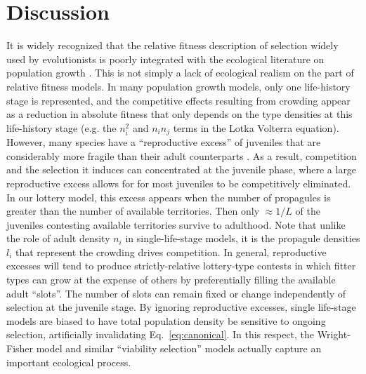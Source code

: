 \documentclass[11pt]{article}
\begin{document}
\section*{Discussion}

It is widely recognized that the relative fitness description of selection widely used by evolutionists is poorly integrated with the ecological literature on population growth \citep{mallet_2012}. This is not simply a lack of ecological realism on the part of relative fitness models. In many population growth models, only one life-history stage is represented, and the competitive effects resulting from crowding appear as a reduction in absolute fitness that only depends on the type densities at this life-history stage (e.g. the $n_i^2$ and $n_in_j$ terms in the Lotka Volterra equation). However, many species have a ``reproductive excess'' of juveniles that are considerably more fragile than their adult counterparts \citep{chesson_1983}. As a result, competition and the selection it induces can concentrated at the juvenile phase, where a large reproductive excess allows for for most juveniles to be competitively eliminated. In our lottery model, this excess appears when the number of propagules is greater than the number of available territories. Then only $\approx 1/L$ of the juveniles contesting available territories survive to adulthood. Note that unlike the role of adult density $n_i$ in single-life-stage models, it is the propagule densities $l_i$ that represent the crowding drives competition. In general, reproductive excesses will tend to produce strictly-relative lottery-type contests in which fitter types can grow at the expense of others by preferentially filling the available adult ``slots''. The number of slots can remain fixed or change independently of selection at the juvenile stage. By ignoring reproductive excesses, single life-stage models are biased to have total population density be sensitive to ongoing selection, artificially invalidating Eq.~\eqref{eq:canonical}. In this respect, the Wright-Fisher model and similar ``viability selection'' models actually capture an important ecological process.
\end{document}
